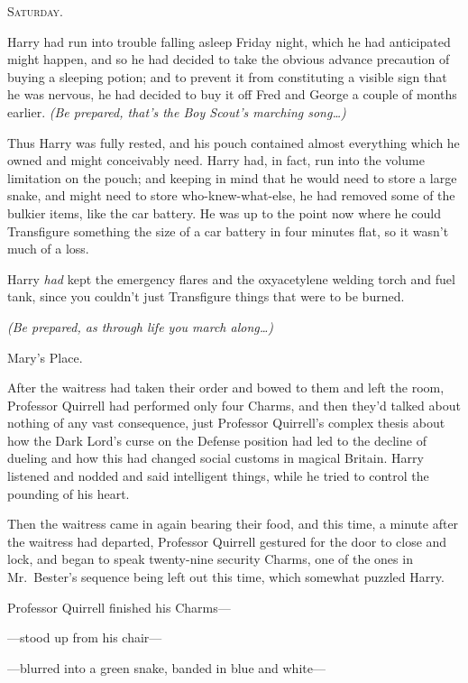 
\lettrine{S}{aturday}.

\quad\quad
Harry had run into trouble falling asleep Friday night, which he had 
anticipated might happen, and so he had decided to take the obvious advance 
precaution of buying a sleeping potion; and to prevent it from constituting a 
visible sign that he was nervous, he had decided to buy it off Fred and George 
a couple of months earlier. \emph{(Be prepared, that's the Boy Scout's marching 
song{\ldots})}

Thus Harry was fully rested, and his pouch contained almost everything which he 
owned and might conceivably need. Harry had, in fact, run into the volume 
limitation on the pouch; and keeping in mind that he would need to store a 
large snake, and might need to store who-knew-what-else, he had removed some of 
the bulkier items, like the car battery. He was up to the point now where he 
could Transfigure something the size of a car battery in four minutes flat, so 
it wasn't much of a loss.

Harry \emph{had} kept the emergency flares and the oxyacetylene welding torch 
and fuel tank, since you couldn't just Transfigure things that were to be 
burned.

\emph{(Be prepared, as through life you march along{\ldots})}

Mary's Place.

After the waitress had taken their order and bowed to them and left the room, 
Professor Quirrell had performed only four Charms, and then they'd talked about 
nothing of any vast consequence, just Professor Quirrell's complex thesis about 
how the Dark Lord's curse on the Defense position had led to the decline of 
dueling and how this had changed social customs in magical Britain. Harry 
listened and nodded and said intelligent things, while he tried to control the 
pounding of his heart.

Then the waitress came in again bearing their food, and this time, a minute 
after the waitress had departed, Professor Quirrell gestured for the door to 
close and lock, and began to speak twenty-nine security Charms, one of the ones 
in Mr.~Bester's sequence being left out this time, which somewhat puzzled Harry.

Professor Quirrell finished his Charms---

---stood up from his chair---

---blurred into a green snake, banded in blue and white---

